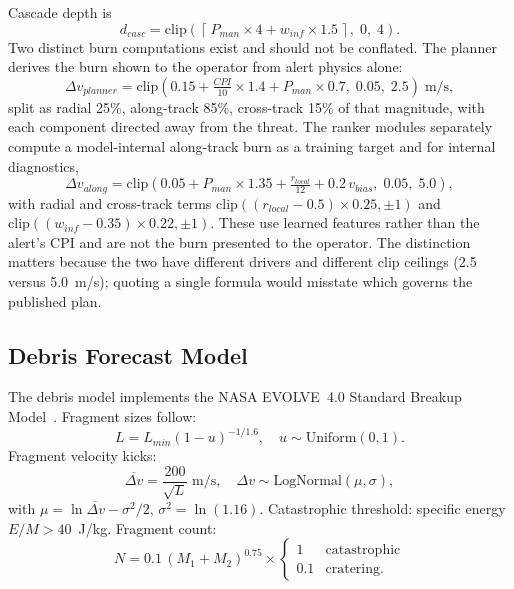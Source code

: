 \documentclass[conference]{IEEEtran}
\begin{document}
Cascade depth is
%
\begin{equation}
  d_{casc} = \mathrm{clip}\!\left(
    \left\lceil\, P_{man}\times 4 + w_{inf}\times 1.5 \,\right\rceil,\; 0,\; 4\right).
\end{equation}
%
Two distinct burn computations exist and should not be conflated. The planner
derives the burn shown to the operator from alert physics alone:
%
\begin{equation}
  \Delta v_{planner} = \mathrm{clip}\!\left(0.15 + \tfrac{CPI}{10}{\times}1.4
             + P_{man}{\times}0.7,\; 0.05,\; 2.5\right)\;\text{m/s},
  \label{eq:burnplanner}
\end{equation}
%
split as radial 25\%, along-track 85\%, cross-track 15\% of that magnitude, with
each component directed away from the threat. The ranker modules separately
compute a model-internal along-track burn as a training target and for internal
diagnostics,
%
\begin{equation}
  \Delta v_{along} = \mathrm{clip}\!\left(0.05 + P_{man}{\times}1.35
             + \tfrac{r_{local}}{12} + 0.2\,v_{bias},\; 0.05,\; 5.0\right),
\end{equation}
%
with radial and cross-track terms $\mathrm{clip}((r_{local}-0.5){\times}0.25,
\pm1)$ and $\mathrm{clip}((w_{inf}-0.35){\times}0.22,\pm1)$. These use learned
features rather than the alert's CPI and are not the burn presented to the
operator. The distinction matters because the two have different drivers and
different clip ceilings (2.5 versus 5.0~m/s); quoting a single formula would
misstate which governs the published plan.

\subsection{Debris Forecast Model}

The debris model implements the NASA EVOLVE~4.0 Standard Breakup
Model~\cite{johnson2001}. Fragment sizes follow:
%
\begin{equation}
  L = L_{min}(1-u)^{-1/1.6},\quad u\sim\mathrm{Uniform}(0,1).
\end{equation}
%
Fragment velocity kicks:
%
\begin{equation}
  \overline{\Delta v} = \frac{200}{\sqrt{L}}\;\text{m/s},\quad
  \Delta v \sim \mathrm{LogNormal}(\mu, \sigma),
\end{equation}
%
with $\mu = \ln\overline{\Delta v} - \sigma^2/2$, $\sigma^2 = \ln(1.16)$.
Catastrophic threshold: specific energy $E/M > 40$~J/kg. Fragment count:
%
\begin{equation}
  N = 0.1\,(M_1+M_2)^{0.75}
    \times\begin{cases}1 & \text{catastrophic}\\0.1 & \text{cratering.}\end{cases}
\end{equation}
\end{document}

